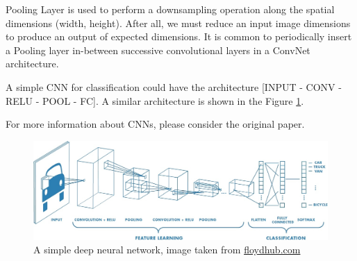 Pooling Layer is used to perform a downsampling operation along the spatial dimensions (width, height). After all, we must reduce an input image dimensions to produce an output of expected dimensions.  It is common to periodically insert a Pooling layer in-between successive convolutional layers in a ConvNet architecture.

A simple CNN for classification could have the architecture [INPUT - CONV - RELU - POOL - FC]. A similar architecture is shown in the Figure \ref{fig:cnn}.

 For more information about CNNs, please consider the original paper\cite{krizhevsky2012imagenet}. 
 
\begin{figure}[h]
\includegraphics[width=13cm]{cnn}
\caption{A simple deep neural network, image taken from \url{floydhub.com}}
\label{fig:cnn}
\end{figure}
